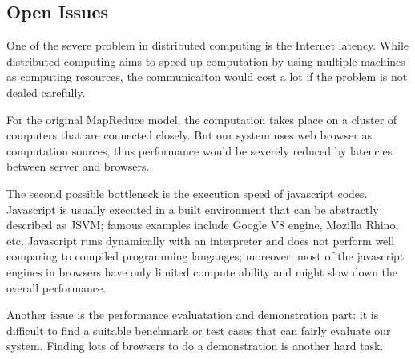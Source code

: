 \subsection{Open Issues}

One of the severe problem in distributed computing is the Internet latency. While distributed computing aims to speed up computation by using multiple machines as computing resources, the communicaiton would cost a lot if the problem is not dealed carefully.

For the original MapReduce model, the computation takes place on a cluster of computers that are connected closely. But our system uses web browser as computation sources, thus performance would be severely reduced by latencies between server and browsers.

The second possible bottleneck is the execution speed of javascript codes. Javascript is usually executed in a built environment that can be abstractly described as JSVM; famous examples include Google V8 engine, Mozilla Rhino, etc.
Javascript runs dynamically with an interpreter and does not perform well comparing to compiled programming langauges; moreover, most of the javascript engines in browsers have only limited compute ability and might slow down the overall performance.

Another issue is the performance evaluatation and demonstration part: it is difficult to find a suitable benchmark or test cases that can fairly evaluate our system. Finding lots of browsers to do a demonstration is another hard task.